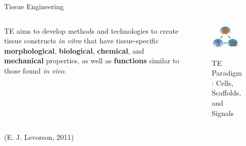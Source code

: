\documentclass[11pt,t]{beamer}
\begin{document}
\begin{frame}[fragile]{Tissue Engineering}  

	\begin{columns}[t]
		\begin{column}{.55\textwidth}
			TE aims to develop methods and technologies to create tissue constructs \emph{in vitro} that have tissue-specific \textbf{morphological}, \textbf{biological}, \textbf{chemical}, and \textbf{mechanical} properties, as well as \textbf{functions} similar to those found \emph{in vivo}.
		\end{column}
		\begin{column}{.45\textwidth}
			\vspace{-30pt}
			\begin{figure}
			\centering
			\includegraphics[width=0.9\textwidth]{te_paradigm2}
			
			\footnotesize	TE Paradigm: Cells, Scaffolds, and Signals
			\end{figure}
		\end{column}
	\end{columns}	
	
	\footnotesize(E. J. Levorson, 2011)

\end{frame}
\end{document}
